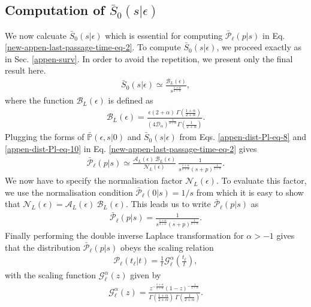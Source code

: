 \documentclass[superscriptaddress,amsmath,amssymb,aps,onecolumn]{revtex4}
\def\greenw#1{{\color{black} #1}}
\begin{document}
\subsection{Computation of $\bar{S}_0(s|\epsilon) $}
We now calcuate $\bar{S}_0(s|\epsilon) $ which is essential for computing $\bar{\mathcal{P}}_{ \ell } \left( p|s \right)$ in Eq. \eqref{new-appen-last-passage-time-eq-2}. To compute $\bar{S}_0(s|\epsilon) $, we proceed exactly as in Sec. \ref{appen-surv}. In order to avoid the repetition, we present only the final result here.
\begin{align}
\bar{S}_0(s|\epsilon) \simeq \frac{\mathcal{B}_L(\epsilon)}{s^{\frac{1+\alpha}{2+\alpha}}},
\label{appen-dist-Pl-eq-10}
\end{align}
where the function $\mathcal{B}_L(\epsilon)$ is defined as
\begin{align}
\mathcal{B}_L(\epsilon) = \frac{\epsilon (2+\alpha)~ \Gamma \left( \frac{1+\alpha}{2+\alpha}\right)}{\left( 4 \mathcal{D}_{\alpha} \right)^{\frac{1}{2+\alpha}}  \Gamma \left( \frac{1}{2+\alpha}\right)}.
\label{appen-dist-Pl-eq-11}
\end{align}
Plugging the forms of $\bar{\mathbb{P}}(\epsilon, s|0)$ and $\bar{S}_0(s|\epsilon)$ from Eqs. \eqref{appen-dist-Pl-eq-8} and \eqref{appen-dist-Pl-eq-10} in Eq. \eqref{new-appen-last-passage-time-eq-2} gives
\begin{align}
\bar{\mathcal{P}}_{ \ell } \left( p|s \right) \simeq \frac{\mathcal{A}_L (\epsilon)~\mathcal{B}_L (\epsilon)}{\mathcal{N}_L(\epsilon)}~\frac{1}{s^{\frac{1+\alpha}{2+\alpha}} \left(s+p \right)^{\frac{1}{2+\alpha}}}.
\label{new-appen-last-passage-time-eq-5}
\end{align}
We now have to specify the normalisation factor $\mathcal{N}_L(\epsilon)$. To evaluate this factor, we use the normalisation condition $\bar{\mathcal{P}}_{ \ell } \left( 0|s \right) = 1/s $ from which it is easy to show that $\mathcal{N}_L(\epsilon) =\mathcal{A}_L (\epsilon)~\mathcal{B}_L (\epsilon)$. This leads us to write $\bar{\mathcal{P}}_{ \ell } \left( p|s \right)$ as
\begin{align}
\bar{\mathcal{P}}_{ \ell } \left( p|s \right)= \frac{1}{s^{\frac{1+\alpha}{2+\alpha}} \left(s+p \right)^{\frac{1}{2+\alpha}}}.
\label{new-appen-last-passage-time-eq-6}
\end{align}
\greenw{Finally performing the double inverse Laplace transformation for $\alpha >-1$ gives that the distribution $\bar{\mathcal{P}}_{ \ell } \left( p|s \right)$ obeys the scaling relation} 
\begin{align}
\mathcal{P}_{ \ell } \left( t_{\ell}|t \right) = \frac{1}{t} \mathcal{G}_{\ell}^{\alpha} \left( \frac{t_{\ell}}{t}\right),
\label{new-appen-last-passage-time-eq-7}
\end{align}
with the scaling function $\mathcal{G}_{\ell}^{\alpha} \left( z \right)$ given by
\begin{align}
\mathcal{G}_{\ell}^{\alpha} \left( z \right) = \frac{z^{-\frac{1+\alpha}{2+\alpha}} \left( 1-z \right) ^{-\frac{1}{2+\alpha}}}{\Gamma \left( \frac{1+\alpha}{2+\alpha}\right)~\Gamma \left( \frac{1}{2+\alpha}\right)}.
\label{new-appen-last-passage-time-eq-9}
\end{align}
\end{document}
